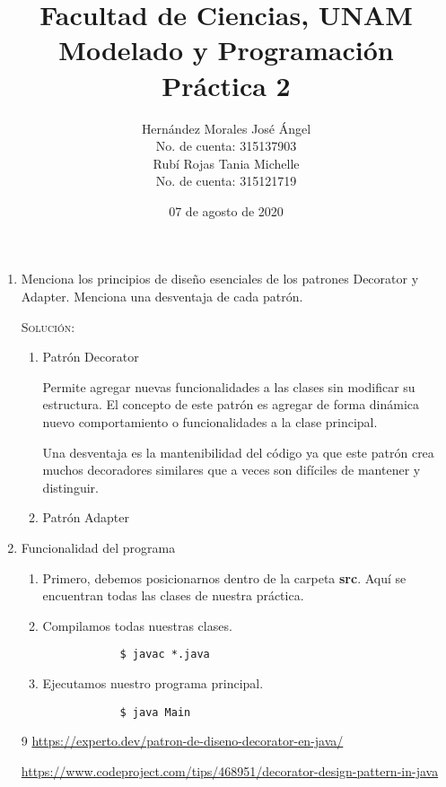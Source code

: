 \documentclass[letterpaper,11pt]{article}
\title{Facultad de Ciencias, UNAM \\ Modelado y Programación \\ Práctica 2}
\author{Hernández Morales José Ángel \\ No. de cuenta: 315137903 \\ 
        Rubí Rojas Tania Michelle \\ No. de cuenta: 315121719}
\date{07 de agosto de 2020}
\begin{document}
\maketitle

\begin{enumerate}
    \item Menciona los principios de diseño esenciales de los patrones Decorator 
    y Adapter. Menciona una desventaja de cada patrón.

    \textsc{Solución:}
    \begin{enumerate}
        \item Patrón Decorator 
        
        Permite agregar nuevas funcionalidades a las clases sin modificar su 
        estructura. El concepto de este patrón es agregar de forma dinámica 
        nuevo comportamiento o funcionalidades a la clase principal. 

        Una desventaja es la mantenibilidad del código ya que este patrón crea 
        muchos decoradores similares que a veces son difíciles de mantener y 
        distinguir. 

        \item Patrón Adapter
    \end{enumerate}

    \item Funcionalidad del programa
    \begin{enumerate}
        \item Primero, debemos posicionarnos dentro de la carpeta \textbf{src}.
        Aquí se encuentran todas las clases de nuestra práctica.

        \item Compilamos todas nuestras clases.
        \begin{verbatim}
            $ javac *.java
        \end{verbatim}

        \item Ejecutamos nuestro programa principal.
        \begin{verbatim}
            $ java Main 
        \end{verbatim}
    \end{enumerate}

    \begin{thebibliography} {9}
        \url{https://experto.dev/patron-de-diseno-decorator-en-java/}

        \url{https://www.codeproject.com/tips/468951/decorator-design-pattern-in-java}
        
    \end{thebibliography}
\end{enumerate}
\end{document}
